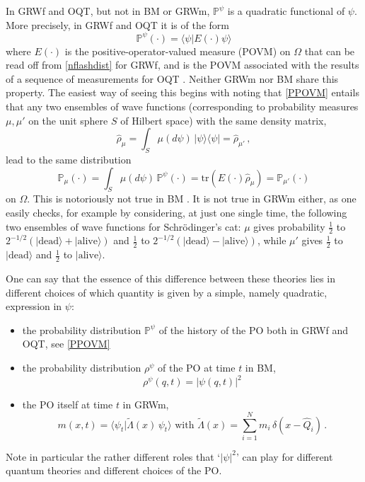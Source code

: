 \documentclass[12pt]{article}
\newcommand{\PPP}{\mathbb{P}}
\renewcommand{\sp}[2]{\langle #1|#2 \rangle}
\begin{document}
In {\sf GRWf} and {\sf OQT}, but not in {\sf BM} or {\sf GRWm}, $\PPP^\psi$ is a quadratic functional of $\psi$. More precisely, in {\sf GRWf} and {\sf OQT} it is of the form
\begin{equation}\label{PPOVM}
  \PPP^\psi(\cdot) = \sp{\psi}{E(\cdot) \psi}
\end{equation}
where $E(\cdot)$ is the positive-operator-valued measure (POVM) on $\Omega$ that can be read off from \eqref{nflashdist} for {\sf GRWf}, and is the POVM associated with the results of a sequence of measurements for {\sf OQT}  \citep[see, e.g.,][]{DGZ04}.
Neither {\sf GRWm} nor {\sf BM} share this property. The easiest way of seeing this begins with noting that \eqref{PPOVM} entails that any two ensembles of wave functions (corresponding to probability measures $\mu,\mu'$ on the unit sphere $S$ of Hilbert space) with the same density matrix,
\begin{equation}\label{dm}
  \hat{\rho}_\mu = \int_S \mu(d\psi) \, |\psi \rangle \langle \psi| =  \hat{\rho}_{\mu'} \,,
\end{equation}
lead to the same distribution
\begin{equation}\label{sameP}
  \PPP_\mu(\cdot) = \int_S \mu(d\psi) \, \PPP^\psi(\cdot) =  \mathrm{tr}(E(\cdot) \hat{\rho}_\mu) = \PPP_{\mu'}(\cdot)
\end{equation}
on $\Omega$. This is notoriously not true in {\sf BM} \citep{Bell80}. It is not true in {\sf GRWm} either, as one easily checks, for example by considering, at just one single time, the following two ensembles of wave functions for Schr\"odinger's cat: $\mu$ gives probability $\frac{1}{2}$ to $2^{-1/2} (|\mathrm{dead}\rangle + |\mathrm{alive}\rangle)$ and $\frac{1}{2}$ to $2^{-1/2} (|\mathrm{dead}\rangle - |\mathrm{alive}\rangle)$, while $\mu'$ gives $\frac{1}{2}$ to $|\mathrm{dead}\rangle$ and $\frac{1}{2}$ to $|\mathrm{alive}\rangle$.

One can say that the essence of this difference between these theories lies in different choices of which quantity is given by a simple, namely quadratic, expression in $\psi$:
\begin{itemize}
\item the probability distribution $\PPP^\psi$ of the history of the PO both in {\sf GRWf} and {\sf OQT}, see \eqref{PPOVM}
\item the probability distribution $\rho^\psi$ of the PO at time $t$ in {\sf BM},
\begin{equation}
  \rho^\psi(q,t) = |\psi(q,t)|^2
\end{equation}
\item the PO itself at time $t$ in {\sf GRWm},
\begin{equation}
  m(x,t) = \sp{\psi_t}{\tilde{\Lambda}(x) \, \psi_t} \text{ with }
  \tilde{\Lambda}(x) = \sum_{i=1}^N m_i \, \delta(x-\widehat{Q}_i)\,.
\end{equation}
\end{itemize}
Note in particular the rather different roles that `$|\psi|^2$' can play for different quantum theories and different choices of the PO. 
\end{document}
